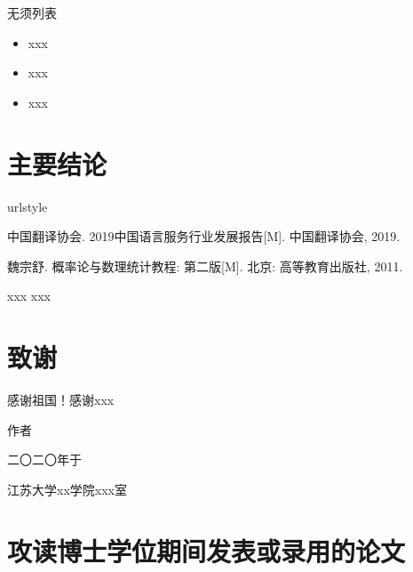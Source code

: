 \documentclass[openright,twoside]{UJS-PhD-thesis}
\begin{document}
无须列表

\begin{itemize}
\item xxx 
\item xxx 
\item xxx 
\end{itemize}

\chapter{主要结论}

\zhlipsum            %

\clearpage






\begin{thebibliography}{4}
\providecommand{\natexlab}[1]{#1}
\providecommand{\url}[1]{#1}
\expandafter\ifx\csname urlstyle\endcsname\relax\relax\else
  \fi
\providecommand{\href}[2]{\url{#2}}
\providecommand{\doi}[1]{\href{https://doi.org/#1}{#1}}

 中国翻译协会. 2019中国语言服务行业发展报告[M]. 中国翻译协会, 2019.

 魏宗舒. 概率论与数理统计教程: 第二版[M]. 北京: 高等教育出版社, 2011.

 xxx
 xxx

\end{thebibliography}

\chapter*{致谢}

感谢祖国！感谢xxx

\zhlipsum[13]     %

\vspace*{4.5em}

\hfill 作者

\hfill 二〇二〇年于

\hfill 江苏大学xx学院xxx室

\chapter*{攻读博士学位期间发表或录用的论文}
\end{document}
